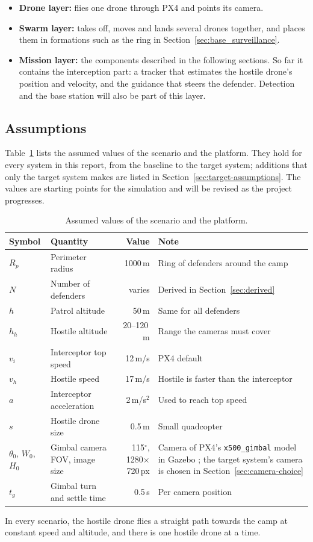 \begin{itemize}
    \item \textbf{Drone layer:} flies one drone through PX4 and points its camera.
    \item \textbf{Swarm layer:} takes off, moves and lands several drones
          together, and places them in formations such as the ring in
          Section~\ref{sec:base_surveillance}.
    \item \textbf{Mission layer:} the components described in the following
          sections. So far it contains the interception part: a tracker that
          estimates the hostile drone's position and velocity, and the
          guidance that steers the defender. Detection and the base station will also be part of this layer.
\end{itemize}



\subsection{Assumptions}
\label{sec:assumptions}

Table~\ref{tab:assumptions} lists the assumed values of the scenario and the
platform. They hold for every system in this report, from the baseline to the
target system; additions that only the target system makes are listed in
Section~\ref{sec:target-assumptions}. The values are starting points for the
simulation and will be revised as the project progresses.

\begin{table}[H]
\centering
\small
\begin{tabular}{|l|p{}|r|p{}|}
\hline
\textbf{Symbol} & \textbf{Quantity} & \textbf{Value} & \textbf{Note} \\
\hline
$R_p$ & Perimeter radius & 1000\,m & Ring of defenders around the camp \\
$N$ & Number of defenders & varies & Derived in Section~\ref{sec:derived} \\
$h$ & Patrol altitude & 50\,m & Same for all defenders \\
$h_h$ & Hostile altitude & 20--120\,m & Range the cameras must cover \\
$v_i$ & Interceptor top speed & 12\,m/s & PX4 default \cite{px4params} \\
$v_h$ & Hostile speed & 17\,m/s & Hostile is faster than the interceptor \\
$a$ & Interceptor acceleration & 2\,m/s$^2$ & Used to reach top speed \\
$s$ & Hostile drone size & 0.5\,m & Small quadcopter \\
$\theta_0$, $W_0$, $H_0$ & Gimbal camera FOV, image size & 115$^\circ$, 1280$\times$720\,px & Camera of PX4's \texttt{x500\_gimbal} model in Gazebo \cite{px4gazebomodels}; the target system's camera is chosen in Section~\ref{sec:camera-choice} \\
$t_g$ & Gimbal turn and settle time & 0.5\,s & Per camera position \\
\hline
\end{tabular}
\caption{Assumed values of the scenario and the platform.}
\label{tab:assumptions}
\end{table}

In every scenario, the hostile drone flies a straight path towards the camp
at constant speed and altitude, and there is one hostile drone at a time.
